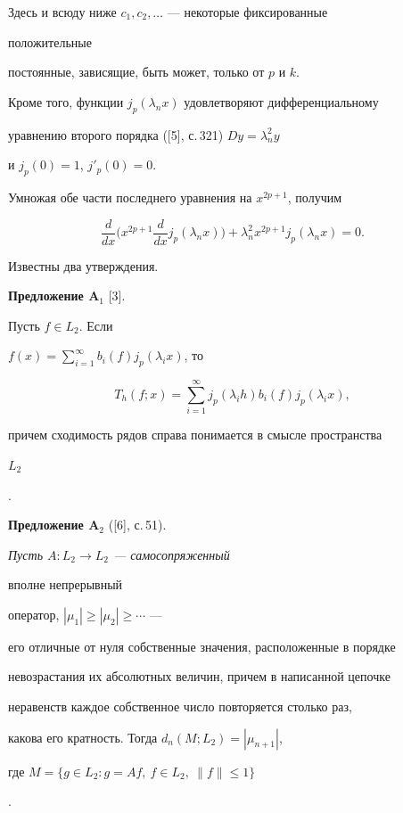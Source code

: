 Здесь и всюду ниже $c_1,c_2,\dotsc$ --- некоторые фиксированные 


положительные 


постоянные, зависящие, быть может, только от $p$ и $k$. 


 


Кроме того, функции $j_p(\lambda_n x)$ удовлетворяют дифференциальному 


уравнению второго порядка ([5], с.\,321) $Dy=\lambda^2_n y$ 


и $j_p(0)=1$, $j'_p(0)=0$. 


Умножая обе части последнего уравнения на $x^{2p+1}$, получим 


\begin{equation} 


\frac{d}{dx}\bigg(x^{2p+1}\frac{d}{dx}j_p(\lambda_n x)\bigg)+ 


\lambda^2_n x^{2p+1}j_p(\lambda_n x)=0. 


\end{equation} 


 


Известны два утверждения.


\medskip 


 


{\bf Предложение A$_1$} [3]. {\it 


Пусть $f\in L_2$. Если 


$f(x)=\sum\limits^\infty_{i=1}b_i(f)j_p(\lambda_i x)$, то 


$$


T_h(f;x)=\sum\limits^\infty_{i=1}j_p(\lambda_i h)b_i(f)j_p(\lambda_i x), 


$$


причем сходимость рядов справа понимается в смысле пространства 


$L_2$}. 


\medskip 


 


{\bf Предложение A$_2$} ([6], с.\,51).


{\it Пусть $A:L_2\to L_2$ --- самосопряженный 


вполне непрерывный 


оператор, $|\mu_1|\ge|\mu_2|\ge\dotsb$ --- 


его отличные от нуля собственные значения, расположенные в порядке 


невозрастания их абсолютных величин, причем в написанной цепочке 


неравенств каждое собственное число повторяется столько раз, 


какова его кратность. Тогда $d_n(M;L_2)=|\mu_{n+1}|$, 


где $M=\{g\in L_2:g=A f,\ f\in L_2,\ \|f\|\le1\}$}. 


